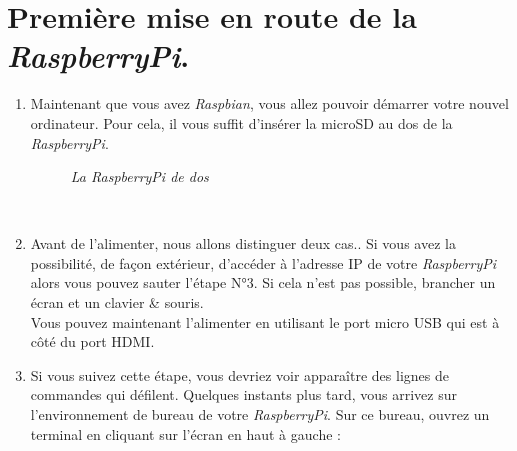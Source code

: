 \section{Première mise en route de la \textit{RaspberryPi}.}

\begin{enumerate}

	\item Maintenant que vous avez \textit{Raspbian}, vous allez pouvoir démarrer votre nouvel ordinateur.
Pour cela, il vous suffit d'insérer la microSD au dos de la \textit{RaspberryPi}.\\
\begin{figure}[H]
\begin{center}
\end{center}
	\caption{ \textit{La \textit{RaspberryPi} de dos}}
\end{figure}\\

	\item Avant de l'alimenter, nous allons distinguer deux cas.. Si vous avez la possibilité, de façon extérieur, d'accéder à l'adresse IP de votre \textit{RaspberryPi} alors vous pouvez sauter l'étape N°3. Si cela n'est pas possible, brancher un écran et un clavier & souris.\\
	Vous pouvez maintenant l'alimenter en utilisant le port micro USB qui est à côté du port HDMI.\\

\newpage
	
	\item Si vous suivez cette étape, vous devriez voir apparaître des lignes de commandes qui défilent. Quelques instants plus tard, vous arrivez sur l'environnement de bureau de votre \textit{RaspberryPi}. Sur ce bureau, ouvrez un terminal en cliquant sur l'écran en haut à gauche : 
	

\end{enumerate}
